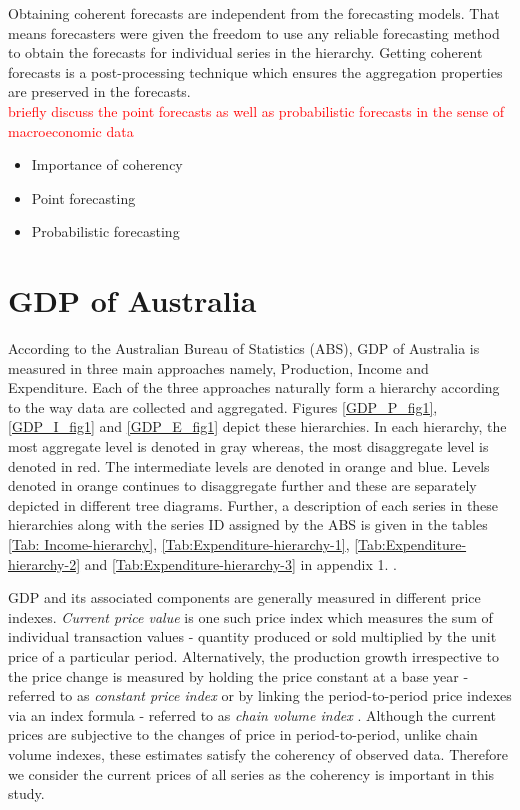 \documentclass[graybox]{svmult}
\begin{document}
Obtaining coherent forecasts are independent from the forecasting models. That means forecasters were given the freedom to use any reliable forecasting method to obtain the forecasts for individual series in the hierarchy. Getting coherent forecasts is a post-processing technique which ensures the aggregation properties are preserved in the forecasts.   \\


\textcolor{red}{briefly discuss the point forecasts as well as probabilistic forecasts in the sense of macroeconomic data  }

\begin{itemize}
	\item Importance of coherency
	\item Point forecasting
	\item Probabilistic forecasting
\end{itemize}

\section{GDP of Australia}

According to the Australian Bureau of Statistics (ABS), GDP of Australia is measured in three main approaches namely, Production, Income and Expenditure. Each of the three approaches naturally form a hierarchy according to the way data are collected and aggregated. Figures \ref{GDP_P_fig1}, \ref{GDP_I_fig1} and \ref{GDP_E_fig1} depict these hierarchies. In each hierarchy, the most aggregate level is denoted in gray whereas, the most disaggregate level is denoted in red. The intermediate levels are denoted in orange and blue. Levels denoted in orange continues to disaggregate further and these are separately depicted in different tree diagrams. Further, a description of each series in these hierarchies along with the series ID assigned by the ABS is given in the tables \ref{Tab: Income-hierarchy}, \ref{Tab:Expenditure-hierarchy-1}, \ref{Tab:Expenditure-hierarchy-2} and \ref{Tab:Expenditure-hierarchy-3} in appendix 1.
. 

GDP and its associated components are generally measured in different price indexes. \textit{Current price value} is one such price index which measures the sum of individual transaction values - quantity produced or sold multiplied by the unit price of a particular period. Alternatively, the production growth irrespective to the price change is measured by holding the price constant at a base year - referred to as \textit{constant price index} or by linking the period-to-period price indexes via an index formula - referred to as \textit{chain volume index} \citep{ABS2015}. Although the current prices are subjective to the changes of price in period-to-period, unlike chain volume indexes, these estimates satisfy the coherency of observed data. Therefore we consider the current prices of all series as the coherency is important in this study. 
\end{document}
